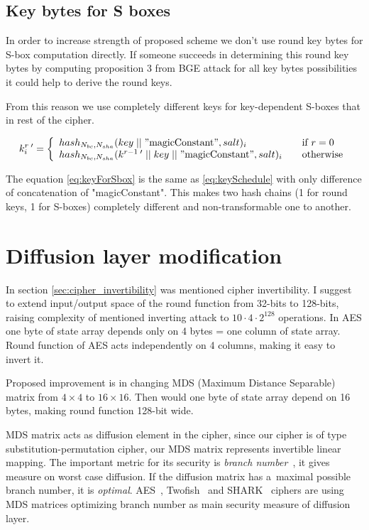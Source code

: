 \documentclass[11pt,oneside,final]{fithesis2}
\begin{document}
    \subsection{Key bytes for S boxes}
    In order to increase strength of proposed scheme we don't use round key bytes for S-box computation directly. If someone succeeds in determining 
    this round key bytes by computing proposition 3 from BGE attack for all key bytes possibilities it could help to derive the round keys.
    
    From this reason we use completely different keys for key-dependent S-boxes that in rest of the cipher.

    \begin{equation}\label{eq:keyForSbox}
    k_i^{r \; \prime} = \left\{ 
    \begin{array}{l l} 
	hash_{N_{bc}, N_{sha}}(key\; || \; "\text{magicConstant}", salt)_i                              & \quad \text{if $r=0$}\\
	hash_{N_{bc}, N_{sha}}(k^{r-1 \; \prime} \; || \; key \; || \; "\text{magicConstant}", salt)_i            & \quad \text{otherwise}
    \end{array} \right.
    \end{equation}
    
    The equation \ref{eq:keyForSbox} is the same as \ref{eq:keySchedule} with only difference of concatenation of "magicConstant". This makes 
    two hash chains (1 for round keys, 1 for S-boxes) completely different and non-transformable one to another.
   
    \section{Diffusion layer modification}\label{sec:cipher_invert_improvement}
    In section \ref{sec:cipher_invertibility} was mentioned cipher invertibility. I suggest to extend input/output space of the round function
    from 32-bits to 128-bits, raising complexity of mentioned inverting attack to $10\cdot4\cdot2^{128}$ operations. In AES one byte of state array depends
    only on 4 bytes = one column of state array. Round function of AES acts independently on 4 columns, making it easy to invert it. 

    Proposed improvement is in changing MDS (Maximum Distance Separable) matrix from $4 \times 4$ to $16 \times 16$. 
    Then would one byte of state array depend on 16 bytes, making round function 128-bit wide.

    MDS matrix acts as diffusion element in the cipher, since our cipher is of type substitution-permutation cipher, our MDS matrix 
    represents invertible linear mapping. The important metric for its security is \emph{branch number}~\citep{daemenBranch}, it gives measure on
    worst case diffusion. If the diffusion matrix has a~maximal possible branch number, it is \emph{optimal}. 
    AES~\citep{2002-daemen}, Twofish~\citep{Schneier98twofish:a} and SHARK~\citep{shark96} ciphers are using MDS matrices optimizing branch number as 
    main security measure of diffusion layer.
    
\end{document}
